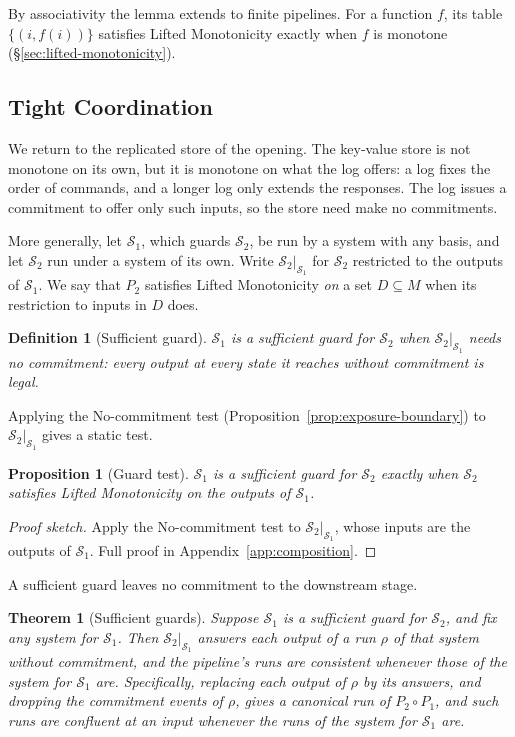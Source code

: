 \documentclass[sigconf]{cidr-2027}
\newtheorem{theorem}{Theorem}
\newtheorem{proposition}{Proposition}
\newtheorem{definition}{Definition}
\theoremstyle{remark}
\newcommand{\commitment}{commitment\xspace}
\newcommand{\commitments}{commitments\xspace}
\newcommand{\Spec}{\mathcal{S}}
\begin{document}
\textcolor{reviewed}{By associativity the lemma extends to finite pipelines.} For a function $f$,
its table $\{(i,f(i))\}$ satisfies Lifted Monotonicity exactly when $f$ is
monotone (\S\ref{sec:lifted-monotonicity}).

\subsection{Tight Coordination}
\label{sec:tight-coordination}

We return to the replicated store of the opening. The key-value store is not
monotone on its own, but it is monotone on what the log offers: a log fixes
the order of commands, and a longer log only extends the responses. The log
issues a \commitment to offer only such inputs, so the store need make no
\commitments.

More generally, let $\Spec_1$, which guards $\Spec_2$, be run by a system with any basis, and
let $\Spec_2$ run under a system of its own. \textcolor{reviewed}{Write $\Spec_2|_{\Spec_1}$ for $\Spec_2$ restricted to the outputs of
$\Spec_1$.} We say that $P_2$ satisfies Lifted Monotonicity \emph{on} a set
$D\subseteq M$ when its restriction to inputs in $D$ does.

\begin{definition}[Sufficient guard]
\label{def:sufficient-guard}
\textcolor{reviewed}{$\Spec_1$ is a \emph{sufficient guard} for $\Spec_2$ when
$\Spec_2|_{\Spec_1}$ needs no \commitment: every output at every state it
reaches without \commitment is legal.}
\end{definition}

Applying the No-\commitment test (Proposition~\ref{prop:exposure-boundary})
to $\Spec_2|_{\Spec_1}$ gives a static test.

\begin{proposition}[Guard test]
\label{prop:guard-test}
$\Spec_1$ is a sufficient guard for $\Spec_2$ exactly when
$\Spec_2$ satisfies Lifted Monotonicity on the outputs of $\Spec_1$.
\end{proposition}

\begin{proof}[Proof sketch]
Apply the No-\commitment test to $\Spec_2|_{\Spec_1}$, whose inputs are the
outputs of $\Spec_1$. Full proof in Appendix~\ref{app:composition}.
\end{proof}

A sufficient guard leaves no \commitment to the downstream stage.

\begin{theorem}[Sufficient guards]
\label{thm:sufficient-guards}
\textcolor{reviewed}{Suppose $\Spec_1$ is a sufficient guard for $\Spec_2$, and fix any
system for $\Spec_1$.} Then $\Spec_2|_{\Spec_1}$ answers each output of a run
$\rho$ of that system without \commitment, and the pipeline's runs are
consistent whenever those of the system for $\Spec_1$ are. Specifically,
replacing each output of $\rho$ by its answers, and dropping the \commitment
events of $\rho$, gives a canonical run of $P_2\circ P_1$, and such runs are
confluent at an input whenever the runs of the system for $\Spec_1$ are.
\end{theorem}
\end{document}
